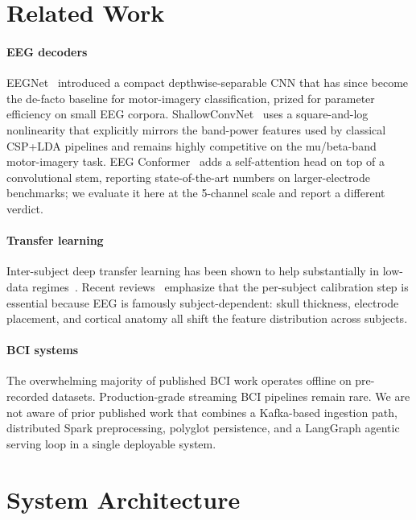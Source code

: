 \documentclass[conference]{IEEEtran}
\begin{document}
\section{Related Work}

\paragraph{EEG decoders} EEGNet~\cite{ref:lawhern2018} introduced a compact
depthwise-separable CNN that has since become the de-facto baseline for
motor-imagery classification, prized for parameter efficiency on small
EEG corpora. ShallowConvNet~\cite{ref:schirrmeister2017} uses a square-and-log
nonlinearity that explicitly mirrors the band-power features used by
classical CSP+LDA pipelines and remains highly competitive on the
mu/beta-band motor-imagery task. EEG Conformer~\cite{ref:song2022} adds a
self-attention head on top of a convolutional stem, reporting state-of-the-art
numbers on larger-electrode benchmarks; we evaluate it here at the 5-channel
scale and report a different verdict.

\paragraph{Transfer learning} Inter-subject deep transfer learning has been
shown to help substantially in low-data regimes~\cite{ref:wei2021}. Recent
reviews~\cite{ref:lotte2018} emphasize that the per-subject calibration step
is essential because EEG is famously subject-dependent: skull thickness,
electrode placement, and cortical anatomy all shift the feature distribution
across subjects.

\paragraph{BCI systems} The overwhelming majority of published BCI work
operates offline on pre-recorded datasets. Production-grade streaming BCI
pipelines remain rare. We are not aware of prior published work that combines
a Kafka-based ingestion path, distributed Spark preprocessing, polyglot
persistence, and a LangGraph agentic serving loop in a single deployable
system.

\section{System Architecture}
\end{document}
